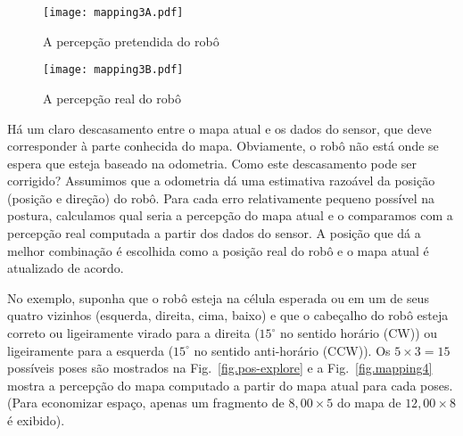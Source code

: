 \begin{figure}
\begin{minipage}{.45\textwidth}
\texttt{[image: mapping3A.pdf]}
\caption{A percepção pretendida do robô}
\label{fig.mapping3a}
\end{minipage}
\hspace{\fill}
\begin{minipage}{.45\textwidth}
\texttt{[image: mapping3B.pdf]}
\caption{A percepção real do robô}
\label{fig.mapping3b}
\end{minipage}
\end{figure}


Há um claro descasamento entre o mapa atual e os dados do sensor, que deve corresponder à parte conhecida do mapa. Obviamente, o robô não está onde se espera que esteja baseado na odometria. Como este descasamento pode ser corrigido? Assumimos que a odometria dá uma estimativa razoável da posição (posição e direção) do robô. Para cada erro relativamente pequeno possível na postura, calculamos qual seria a percepção do mapa atual e o comparamos com a percepção real computada a partir dos dados do sensor. A posição que dá a melhor combinação é escolhida como a posição real do robô e o mapa atual é atualizado de acordo.

No exemplo, suponha que o robô esteja na célula esperada ou em um de seus quatro vizinhos (esquerda, direita, cima, baixo) e que o cabeçalho do robô esteja correto ou ligeiramente virado para a direita ($15^\circ$ no sentido horário (CW)) ou ligeiramente para a esquerda ($15^\circ$ no sentido anti-horário (CCW)). Os $5\times 3=15$ possíveis poses são mostrados na Fig.~\ref{fig.pos-explore} e a Fig.~\ref{fig.mapping4} mostra a percepção do mapa computado a partir do mapa atual para cada poses. (Para economizar espaço, apenas um fragmento de $8,00\times 5$ do mapa de $12,00\times 8$ é exibido).

